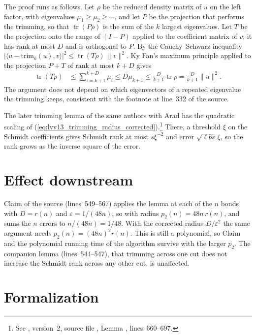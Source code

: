 \documentclass{article}
\begin{document}
The proof runs as follows. Let $\rho$ be the reduced density matrix of $u$ on
the left factor, with eigenvalues $\mu_1\ge\mu_2\ge\cdots$, and let $P$ be the
projection that performs the trimming, so that $\operatorname{tr}(P\rho)$ is
the sum of the $k$ largest eigenvalues. Let $T$ be the projection onto the
range of $(I-P)$ applied to the coefficient matrix of $v$; it has rank at
most $D$ and is orthogonal to $P$. By the Cauchy--Schwarz inequality
$|\langle u-\mathrm{trim}_k(u),v\rangle|^2\le\operatorname{tr}(T\rho)\,
\|v\|^2$. Ky Fan's maximum principle applied to the projection $P+T$ of rank
at most $k+D$ gives
\begin{align}
    \operatorname{tr}(T\rho)
     & \le\sum_{i=k+1}^{k+D}\mu_i\le D\mu_{k+1}
    \le\frac{D}{k+1}\operatorname{tr}\rho
    =\frac{D}{k+1}\|u\|^2.
    \label{eq:lvv13_trimming_radius_ky_fan}
\end{align}
The argument does not depend on which eigenvectors of a repeated eigenvalue
the trimming keeps, consistent with the footnote at line~332 of the source.

The later trimming lemma of the same authors with Arad has the quadratic
scaling of (\ref{eq:lvv13_trimming_radius_corrected}).\footnote{See
    \cite{Arad2016RigorousRG}, version~2, source file
    , Lemma ,
    lines~660--697.}
There, a threshold $\xi$ on the Schmidt coefficients gives Schmidt rank at
most $s\xi^{-2}$ and error $\sqrt{\ell bs}\,\xi$, so the rank grows as the
inverse square of the error.

\section{Effect downstream}

Claim  of the source (lines~549--567) applies the lemma at each
of the $n$ bonds with $D=r(n)$ and $\varepsilon=1/(48n)$, so with radius
$p_2(n)=48n\,r(n)$, and sums the $n$ errors to $n/(48n)=1/48$. With the
corrected radius $D/\varepsilon^2$ the same argument needs
$p_2(n)=(48n)^2r(n)$. This is still a polynomial, so Claim 
and the polynomial running time of the algorithm survive with the larger
$p_2$. The companion lemma  (lines~544--547), that trimming
across one cut does not increase the Schmidt rank across any other cut, is
unaffected.

\section{Formalization}
\end{document}
